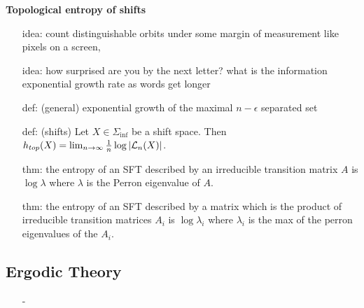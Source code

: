 \documentclass[11pt, reqno]{amsart}
\theoremstyle{plain}
\numberwithin{thm}{subsection}
\theoremstyle{definition}
\begin{document}
{\begin{multicols}{2}
\textbf{Topological entropy of shifts}
\begin{itemize}[leftmargin=2.3em]
  \item[idea:] count distinguishable orbits under some margin of measurement like pixels on a screen, 
  \item[idea:] how surprised are you by the next letter? what is the information exponential growth rate as words get longer
  \item[def:] (general) exponential growth of the maximal $n-\epsilon$ separated set
  \item[def:] (shifts) Let $X \in \Sigma_{\inf}$ be a shift space. Then $h_{top}(X) = \lim_{n \rightarrow \infty} \frac{1}{n} \log |\mathcal{L}_n(X)|$.
  \item[thm:] the entropy of an SFT described by an irreducible transition matrix $A$ is $\log \lambda$ where $\lambda$ is the Perron eigenvalue of $A$.
  \item[thm:] the entropy of an SFT described by a matrix which is the product of irreducible transition matrices $A_i$ is $\log \lambda_i$ where $\lambda_i$ is the max of the perron eigenvalues of the $A_i$.
\end{itemize}


\subsection{Ergodic Theory}  
\begin{itemize}[leftmargin=*]
  \item[-] 
\end{itemize}


\end{multicols}}
\end{document}
